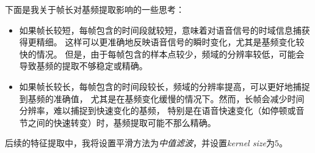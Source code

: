 \documentclass[a4paper]{article}
\begin{document}
\begin{enumerate}
{    下面是我关于帧长对基频提取影响的一些思考：
    \begin{itemize}
      \item 如果帧长较短，每帧包含的时间段就较短，意味着对语音信号的时域信息捕获得更精细。
      这样可以更准确地反映语音信号的瞬时变化，尤其是基频变化较快的情况。
      但是，由于每帧包含的样本点较少，频域的分辨率较低，可能会导致基频的提取不够稳定或精确。
  
      \item 如果帧长较长，每帧包含的时间段较长，频域的分辨率提高，可以更好地捕捉到基频的准确值，
      尤其是在基频变化缓慢的情况下。然而，长帧会减少时间分辨率，难以捕捉到快速变化的基频，
      特别是在语音快速变化（如停顿或音节之间的快速转变）时，基频提取可能不那么精确。
    \end{itemize}

    后续的特征提取中，我将设置平滑方法为\emph{中值滤波}，并设置\emph{kernel size}为\emph{$5$}。
  }
\end{enumerate}
\end{document}
